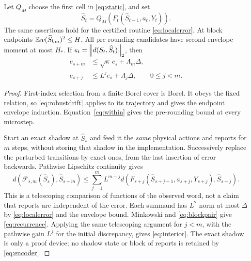 \begin{lemma}\label{lem:block}
Let $Q_M$ choose the first cell in \eqref{eq:static}, and set
\begin{equation}\label{eq:encoder}
 \widehat S_t=Q_M(F_t(\widehat S_{t-1},a_t,Y_t)).
\end{equation}
The same assertions hold for the certified routine \eqref{eq:localerror}. At block endpoints $\mathbb E w(\widehat S_{km})^2\le H$. All pre-rounding candidates have second envelope moment at most $H_*$. If $e_t=\left\lVert d(S_t,\widehat S_t)\right\rVert_2$, then
\begin{align}
 e_{s+m}&\le\sqrt\kappa\,e_s+\Lambda_m\Delta,\label{eq:recurrence}\\
 e_{s+j}&\le L^j e_s+\Lambda_j\Delta,\qquad 0\le j<m.\label{eq:interior}
\end{align}
\end{lemma}
\begin{proof}
First-index selection from a finite Borel cover is Borel. It obeys the fixed relation, so \eqref{eq:robustdrift} applies to its trajectory and gives the endpoint envelope induction. Equation~\eqref{eq:within} gives the pre-rounding bound at every microstep.

Start an exact shadow at $\widehat S_s$ and feed it the \emph{same} physical actions and reports for $m$ steps, without storing that shadow in the implementation. Successively replace the perturbed transitions by exact ones, from the last insertion of error backwards. Pathwise Lipschitz continuity gives
\[
 d(\mathscr F_{s,m}(\widehat S_s),\widehat S_{s+m})
 \le\sum_{j=1}^m L^{m-j}
   d(F_{s+j}(\widehat S_{s+j-1},a_{s+j},Y_{s+j}),\widehat S_{s+j}).
\]
This is a telescoping comparison of functions of the observed word, not a claim that reports are independent of the error. Each summand has $L^2$ norm at most $\Delta$ by \eqref{eq:localerror} and the envelope bound. Minkowski and \eqref{eq:blockpair} give \eqref{eq:recurrence}. Applying the same telescoping argument for $j<m$, with the pathwise gain $L^j$ for the initial discrepancy, gives \eqref{eq:interior}. The exact shadow is only a proof device; no shadow state or block of reports is retained by \eqref{eq:encoder}.
\end{proof}

